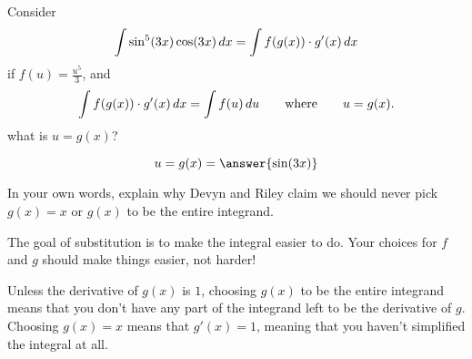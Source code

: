 \documentclass{ximera}
\begin{document}
\begin{problem}
  Consider
  \[
  \int \sin^5(3x) \cos(3x) \,d x = \int f(g(x)) \cdot g'(x) \,d x
  \]
  if $f(u) = \frac{u^5}{3}$, and 
  \[
  \int f(g(x)) \cdot g'(x) \,d x = \int f(u) \,d
  u\qquad\text{where}\qquad u = g(x).
  \]
  what is $u=g(x)$?
  \begin{prompt}
    \[
    u=g(x) = \answer{\sin(3 x)}
    \]
  \end{prompt}
\end{problem}

\begin{problem}
	In your own words, explain why Devyn and Riley claim we should never 
	pick $g(x) = x$ or $g(x)$ to be the entire integrand.
	\begin{freeResponse}
		The goal of substitution is to make the integral easier to do.  Your choices
		for $f$ and $g$ should make things easier, not harder!
	
		Unless the derivative of $g(x)$ is $1$, choosing $g(x)$ to be the entire
		integrand means that you don't have any part of the integrand left to be
		the derivative of $g$.  Choosing $g(x) = x$ means that $g'(x) = 1$, meaning
		that you haven't simplified the integral at all.  
	\end{freeResponse}
\end{problem}


\end{document}
